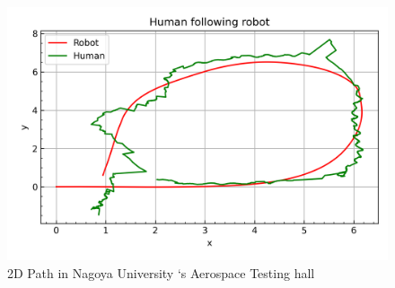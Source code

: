 \begin{figure}[!htb]
    \centering
    \includegraphics[scale=0.8]{figures/chap4_fig/Results/human_following_robot_hall_6.png}
    \caption{2D Path in Nagoya University ‘s Aerospace Testing hall}
    \label{Chap4:Fig9}
\end{figure}

\clearpage

